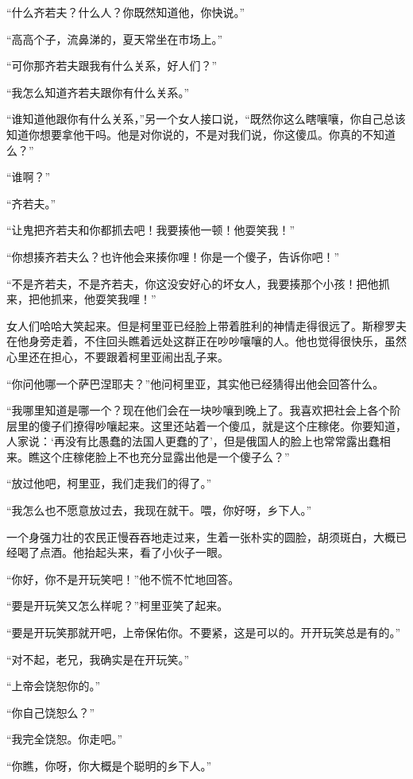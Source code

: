 \par “什么齐若夫？什么人？你既然知道他，你快说。”
\par “高高个子，流鼻涕的，夏天常坐在市场上。”
\par “可你那齐若夫跟我有什么关系，好人们？”
\par “我怎么知道齐若夫跟你有什么关系。”
\par “谁知道他跟你有什么关系，”另一个女人接口说，“既然你这么瞎嚷嚷，你自己总该知道你想要拿他干吗。他是对你说的，不是对我们说，你这傻瓜。你真的不知道么？”
\par “谁啊？”
\par “齐若夫。”
\par “让鬼把齐若夫和你都抓去吧！我要揍他一顿！他耍笑我！”
\par “你想揍齐若夫么？也许他会来揍你哩！你是一个傻子，告诉你吧！”
\par “不是齐若夫，不是齐若夫，你这没安好心的坏女人，我要揍那个小孩！把他抓来，把他抓来，他耍笑我哩！”
\par 女人们哈哈大笑起来。但是柯里亚已经脸上带着胜利的神情走得很远了。斯穆罗夫在他身旁走着，不住回头瞧着远处这群正在吵吵嚷嚷的人。他也觉得很快乐，虽然心里还在担心，不要跟着柯里亚闹出乱子来。
\par “你问他哪一个萨巴涅耶夫？”他问柯里亚，其实他已经猜得出他会回答什么。
\par “我哪里知道是哪一个？现在他们会在一块吵嚷到晚上了。我喜欢把社会上各个阶层里的傻子们撩得吵嚷起来。这里还站着一个傻瓜，就是这个庄稼佬。你要知道，人家说：‘再没有比愚蠢的法国人更蠢的了’，但是俄国人的脸上也常常露出蠢相来。瞧这个庄稼佬脸上不也充分显露出他是一个傻子么？”
\par “放过他吧，柯里亚，我们走我们的得了。”
\par “我怎么也不愿意放过去，我现在就干。喂，你好呀，乡下人。”
\par 一个身强力壮的农民正慢吞吞地走过来，生着一张朴实的圆脸，胡须斑白，大概已经喝了点酒。他抬起头来，看了小伙子一眼。
\par “你好，你不是开玩笑吧！”他不慌不忙地回答。
\par “要是开玩笑又怎么样呢？”柯里亚笑了起来。
\par “要是开玩笑那就开吧，上帝保佑你。不要紧，这是可以的。开开玩笑总是有的。”
\par “对不起，老兄，我确实是在开玩笑。”
\par “上帝会饶恕你的。”
\par “你自己饶恕么？”
\par “我完全饶恕。你走吧。”
\par “你瞧，你呀，你大概是个聪明的乡下人。”
